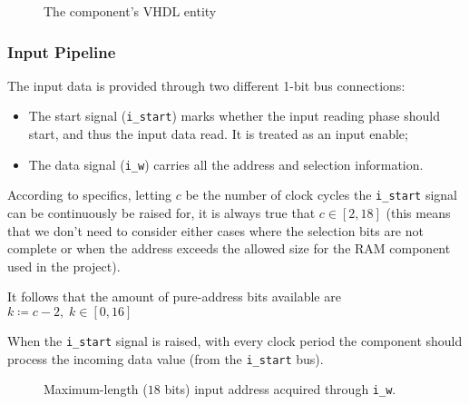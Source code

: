 \documentclass[12pt,a4paper]{article}
\newcommand{\code}{\texttt}
\begin{document}
    \vspace{1cm}

        \begin{figure}[H]
	       \centering
	       
	       \caption{The component's VHDL entity}
        \end{figure}




\newpage
 
	
	\subsubsection{Input Pipeline}
	
	The input data is provided through two different 1-bit bus connections:
	
	\begin{itemize}
		\item The start signal (\code{i\_start}) marks whether the input reading phase should start, and thus the input data read. It is treated as an input enable;
		\item The data signal (\code{i\_w}) carries all the address and selection information.
	\end{itemize}
	
	According to specifics, letting $c$ be the number of clock cycles the \code{i\_start} signal can be continuously be raised for, it is always true that $c \in [2,18]$ (this means that we don't need to consider either cases where the selection bits are not complete or when the address exceeds the allowed size for the RAM component used in the project).
	
	It follows that the amount of pure-address bits available are $k \coloneqq c - 2, \; k \in [0,16]$
	
	When the \code{i\_start} signal is raised, with every clock period the component should process the incoming data value (from the \code{i\_start} bus).
	
	\begin{figure}[htb]
		\centering
		
		\centering
		\caption{Maximum-length ($18$ bits) input address acquired through \code{i\_w}.}
	\end{figure}
	
\end{document}
